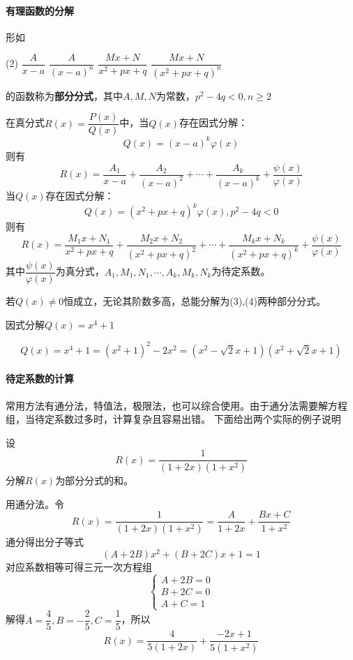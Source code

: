 \paragraph{有理函数的分解}
形如
\begin{tasks}[label=(\arabic*),label-width = 2em](2)
    \task $\dfrac{A}{x-a}$
    \task $\dfrac{A}{(x-a)^n}$
    \task $\dfrac{Mx+N}{x^2+px+q}$
    \task $\dfrac{Mx+N}{(x^2+px+q)^n}$
\end{tasks}
的函数称为\textsf{\textbf{部分分式}}，其中$A,M,N$为常数，$p^2-4q<0,n\geq 2$

在真分式$R(x)=\dfrac{P(x)}{Q(x)}$中，当$Q(x)$存在因式分解：
\[ Q(x) = (x-a)^k\varphi(x) \]
则有
\[ R(x) = \frac{A_1}{x-a} + \frac{A_2}{(x-a)^2} + \cdots + \frac{A_k}{(x-a)^k} + \frac{\psi(x)}{\varphi(x)} \]
当$Q(x)$存在因式分解：
\[ Q(x) = (x^2+px+q)^k\varphi(x),p^2-4q<0 \]
则有
\[ R(x) = \frac{M_1x+N_1}{x^2+px+q} + \frac{M_2x+N_2}{(x^2+px+q)^2} + \cdots + \frac{M_kx+N_k}{(x^2+px+q)^k} + \frac{\psi(x)}{\varphi(x)} \]
其中$\dfrac{\psi(x)}{\varphi(x)}$为真分式，$A_1,M_1,N_1,\cdots,A_k,M_k,N_k$为待定系数。

若$Q(x)\neq 0$恒成立，无论其阶数多高，总能分解为(3),(4)两种部分分式。
\begin{example}
    因式分解$Q(x) =x^4+1$
\end{example}
\begin{solution}
    \[ Q(x) = x^4+1 = (x^2+1)^2-2x^2 = (x^2-\sqrt{2}x+1)(x^2+\sqrt{2}x+1) \]
\end{solution}

\paragraph{待定系数的计算}
常用方法有通分法，特值法，极限法，也可以综合使用。由于通分法需要解方程组，当待定系数过多时，计算复杂且容易出错。
下面给出两个实际的例子说明
\begin{example}
    设
    \[ R(x) = \frac{1}{(1+2x)(1+x^2)} \]
    分解$R(x)$为部分分式的和。
\end{example}
\begin{solution}
    用通分法。令
    \[ R(x) = \frac{1}{(1+2x)(1+x^2)} = \frac{A}{1+2x} + \frac{Bx+C}{1+x^2} \]
    通分得出分子等式
    \[ (A+2B)x^2 + (B+2C)x + 1 = 1 \]
    对应系数相等可得三元一次方程组
    \[
        \begin{cases}
            A+2B = 0 \\
            B+2C = 0 \\
            A+C  = 1
        \end{cases}
    \]
    解得$A=\dfrac{4}{5},B=-\dfrac{2}{5},C=\dfrac{1}{5}$，所以
    \[ R(x) = \frac{4}{5(1+2x)} + \frac{-2x + 1}{5(1+x^2)} \]
\end{solution}


